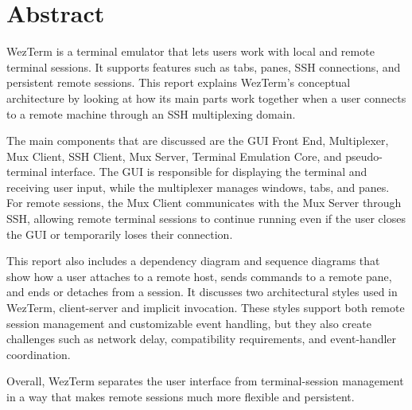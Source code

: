 \section*{Abstract}
\label{sec:abstract}

WezTerm is a terminal emulator that lets users work with local and remote terminal sessions. It supports features such as tabs, panes, SSH connections, and persistent remote sessions. This report explains WezTerm’s conceptual architecture by looking at how its main parts work together when a user connects to a remote machine through an SSH multiplexing domain.

The main components that are discussed are the GUI Front End, Multiplexer, Mux Client, SSH Client, Mux Server, Terminal Emulation Core, and pseudo-terminal interface. The GUI is responsible for displaying the terminal and receiving user input, while the multiplexer manages windows, tabs, and panes. For remote sessions, the Mux Client communicates with the Mux Server through SSH, allowing remote terminal sessions to continue running even if the user closes the GUI or temporarily loses their connection.

This report also includes a dependency diagram and sequence diagrams that show how a user attaches to a remote host, sends commands to a remote pane, and ends or detaches from a session. It discusses two architectural styles used in WezTerm, client-server and implicit invocation. These styles support both remote session management and customizable event handling, but they also create challenges such as network delay, compatibility requirements, and event-handler coordination.

Overall, WezTerm separates the user interface from terminal-session management in a way that makes remote sessions much more flexible and persistent.
